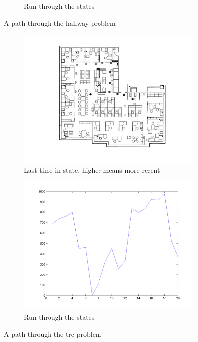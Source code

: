 \documentclass[10pt,a4paper]{article}
\begin{document}
\begin{figure}
\begin{subfigure}{0.48\textwidth}
                \caption{Run through the states}
                \label{fig:path_hallway_part2}
                \hspace{-10pt}
        \end{subfigure}
        \caption{A path through the hallway problem}
        \label{fig:path_hallway}
\end{figure}

\begin{figure}
        \centering
        \begin{subfigure}{0.48\textwidth}
        		\includegraphics[width=\textwidth]{Paths/trc/plot-basic-part1-6129604379.png}
                \caption{Last time in state, higher means more recent}
                \label{fig:path_trc_part1}
                \hspace{10pt}
        \end{subfigure}
        \quad
        \begin{subfigure}{0.48\textwidth}
        		\includegraphics[width=\textwidth]{Paths/trc/plot-basic-part2-6129604379.png}
                \caption{Run through the states}
                \label{fig:path_trc_part2}
                \hspace{-10pt}
        \end{subfigure}
        \caption{A path through the trc problem}
        \label{fig:path_trc}
\end{figure}
\end{document}
